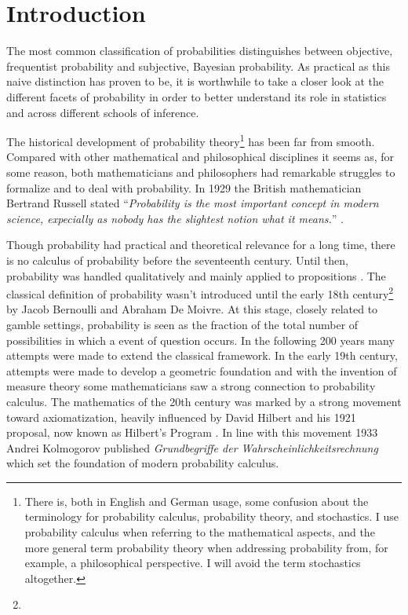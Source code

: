 \documentclass[
]{report}
\author{}
\date{}
\theoremstyle{definition}
\renewcommand*\contentsname{Table of contents}
\newcommand\contentsname{Table of contents}
\begin{document}
\renewcommand{\contentsname}{Contents}
\tableofcontents
{}

\newpage

\section{Introduction}

The most common classification of probabilities distinguishes between
objective, frequentist probability and subjective, Bayesian probability.
As practical as this naive distinction has proven to be, it is
worthwhile to take a closer look at the different facets of probability
in order to better understand its role in statistics and across
different schools of inference.

The historical development of probability theory\footnote{There is, both
  in English and German usage, some confusion about the terminology for
  probability calculus, probability theory, and stochastics. I use
  probability calculus when referring to the mathematical aspects, and
  the more general term probability theory when addressing probability
  from, for example, a philosophical perspective. I will avoid the term
  stochastics altogether.} has been far from smooth. Compared with other
mathematical and philosophical disciplines it seems as, for some reason,
both mathematicians and philosophers had remarkable struggles to
formalize and to deal with probability. In 1929 the British
mathematician Bertrand Russell stated
``\textit{Probability is the most important concept in modern science, expecially as nobody has the slightest notion what it means.}''
\cite{sep-probability-interpret}.

Though probability had practical and theoretical relevance for a long
time, there is no calculus of probability before the seventeenth
century. Until then, probability was handled qualitatively and mainly
applied to propositions \cite{sep-probability-interpret}. The classical
definition of probability wasn't introduced until the early 18th
century\footnote{} by Jacob Bernoulli and Abraham De Moivre. At this
stage, closely related to gamble settings, probability is seen as the
fraction of the total number of possibilities in which a event of
question occurs. In the following 200 years many attempts were made to
extend the classical framework. In the early 19th century, attempts were
made to develop a geometric foundation and with the invention of measure
theory some mathematicians saw a strong connection to probability
calculus. The mathematics of the 20th century was marked by a strong
movement toward axiomatization, heavily influenced by David Hilbert and
his 1921 proposal, now known as Hilbert's Program
\cite{sep-hilbert-program}. In line with this movement 1933 Andrei
Kolmogorov published
\textit{Grundbegriffe der Wahrscheinlichkeitsrechnung} which set the
foundation of modern probability calculus.
\end{document}

